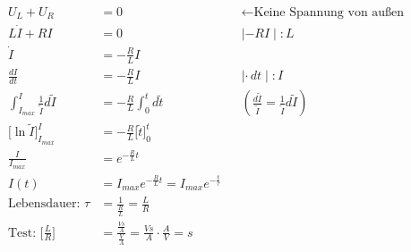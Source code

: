 \documentclass{article}
\begin{document}
	\begin{align}                                                                                                                                      
      U_L + U_R &= 0                                                                                                                                 
          && \leftarrow \text{Keine Spannung von außen}\\[6pt]                                                                                       
      L \dot{I} + RI &= 0
          && \mid {-RI} \mid {:L}\\                                                                                                                  
      \dot{I} &= -\frac{R}{L} I\\[6pt]
      \frac{dI}{dt} &= - \frac{R}{L} I                                                                                                               
          && \mid {\cdot\, dt} \mid {:I}\\[6pt]                                                                                                      
      \int_{I_{max}}^{I} \frac{1}{\tilde{I}} d \tilde{I}
          &= - \frac{R}{L} \int_{0}^{t} d \tilde{t}                                                                                                  
          && \left(\frac{d \tilde{I}}{\tilde{I}} = \frac{1}{\tilde{I}} d \tilde{I}\right)\\[4pt]
      \Big[\ln \tilde{I} \Big]_{I_{max}}^{I}                                                                                                         
          &= - \frac{R}{L} \Big[\tilde{t}\Big]_0^t\\[6pt]                                                                                            
      \frac{I}{I_{max}} &= e^{- \frac{R}{L} t}\\[4pt]                                                                                                
      I(t) &= I_{max} e^{- \frac{R}{L} t} = I_{max} e^{- \frac{t}{\tau}}\\[8pt]                                                                      
      \text{Lebensdauer: } \tau
          &= \frac{1}{\frac{R}{L}} = \frac{L}{R}\\[4pt]                                                                                              
      \text{Test: } \Big[\frac{L}{R}\Big]
          &= \frac{\frac{Vs}{A}}{\frac{V}{A}} = \frac{Vs}{A} \cdot \frac{A}{V} = s\\[8pt]                                                                                                  

\end{align}
\end{document}

